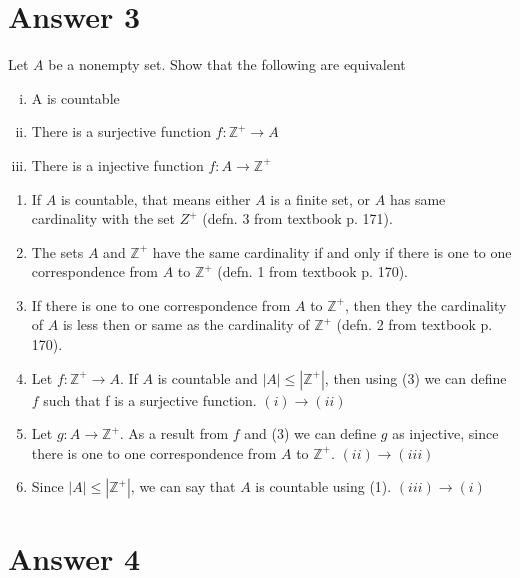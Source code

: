 \documentclass[11pt]{article}
\begin{document}
\pagebreak

\section*{Answer 3}

Let $A$ be a nonempty set. Show that the following are equivalent

\begin{enumerate}[(i)]
    \item A is countable
    \item There is a surjective function $f : \mathbb{Z}^{+} \rightarrow A$
    \item There is a injective function $f : A \rightarrow  \mathbb{Z}^{+} $
\end{enumerate}{}

\hfill

\begin{enumerate}[1)]
    \item If $A$ is countable, that means either $A$ is a finite set, or $A$ has same cardinality with the set $Z^+$ (defn. 3 from textbook p. 171).
    \item The sets $A$ and $\mathbb{Z}^{+}$ have the same cardinality if and only if there is one to one correspondence from $A$ to $\mathbb{Z}^{+}$ (defn. 1 from textbook p. 170).
    \item If there is one to one correspondence from $A$ to $\mathbb{Z}^{+}$, then they the cardinality of $A$ is less then or same as the cardinality of $\mathbb{Z}^{+}$ (defn. 2 from textbook p. 170).
    \item Let $f : \mathbb{Z}^{+} \rightarrow A$. If $A$ is countable and $|A| \leq |\mathbb{Z}^{+}|$, then using (3) we can define $f$ such that f is a surjective function. $(i) \rightarrow (ii)$
    \item Let $g : A \rightarrow \mathbb{Z}^{+}$. As a result from $f$ and (3) we can define $g$ as injective, since there is one to one correspondence from $A$ to $\mathbb{Z}^{+}$. $(ii) \rightarrow (iii)$
    \item Since $|A| \leq |\mathbb{Z}^{+}|$, we can say that $A$ is countable using (1). $(iii) \rightarrow (i)$
\end{enumerate}{}

\hfill

\section*{Answer 4}
\end{document}
